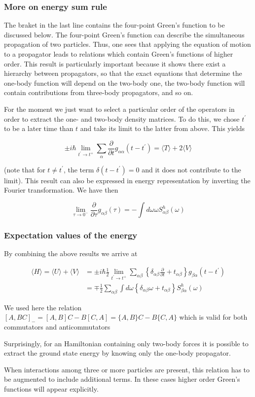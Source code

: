 \documentclass[compress]{beamer}
\begin{document}
\frame
{
\frametitle{More on energy sum rule}
\begin{small}
{\scriptsize

The braket in the last line contains the four-point Green's function to be discussed below.
The four-point Green's function can describe the simultaneous propagation of
two particles. Thus, one sees that applying the equation of motion to
a propagator leads to relations which contain Green's functions of
higher order. This result is particularly important because it shows
there exist a hierarchy between propagators, so that the exact
equations that determine the one-body function will depend on the
two-body one, the two-body function will contain contributions from
three-body propagators, and so on.

For the moment we just want to select a particular order of the
operators in order to extract the one- and two-body
density matrices. To do this, we chose $t^{\prime}$ to be a later time
than $t$ and take its limit to the latter from above. This yields

$$
\pm i \hbar \lim _{t^{\prime} \rightarrow t^{+}} \sum_{\alpha} \frac{\partial}{\partial t} g_{\alpha \alpha}\left(t-t^{\prime}\right)=\langle T\rangle+2\langle V\rangle
$$

(note that for $t \neq t^{\prime}$, the term
$\delta\left(t-t^{\prime}\right)=0$ and it does not contribute to the
limit). This result can also be expressed in energy representation by
inverting the Fourier transformation. We have then

$$
\lim _{\tau \rightarrow 0^{-}} \frac{\partial}{\partial \tau} g_{\alpha \beta}(\tau)=-\int d \omega \omega S_{\alpha \beta}^{h}(\omega)
$$

}
\end{small}
}
\frame
{
\frametitle{Expectation values of the energy}
\begin{small}
{\scriptsize
By combining the above results we arrive at

$$
\begin{aligned}
\langle H\rangle=\langle U\rangle+\langle V\rangle & = \pm i \hbar \frac{1}{2} \lim _{t^{\prime} \rightarrow t^{+}} \sum_{\alpha \beta}\left\{\delta_{\alpha \beta} \frac{\partial}{\partial t}+t_{\alpha \beta}\right\} g_{\beta \alpha}\left(t-t^{\prime}\right) \\
& =\mp \frac{1}{2} \sum_{\alpha \beta} \int d \omega\left\{\delta_{\alpha \beta} \omega+t_{\alpha \beta}\right\} S_{\beta \alpha}^{h}(\omega)
\end{aligned}
$$

We used here the relation $[A, B C]_{-}=[A, B] C-B[C, A]=\{A, B\}
C-B\{C, A\}$ which is valid for both commutators and anticommutators


Surprisingly, for an Hamiltonian containing only two-body forces it is
possible to extract the ground state energy by knowing only the
one-body propagator. 

When interactions among three or more particles are present, this
relation has to be augmented to include additional terms. In these
cases higher order Green's functions will appear explicitly.

}
\end{small}
}
\end{document}
